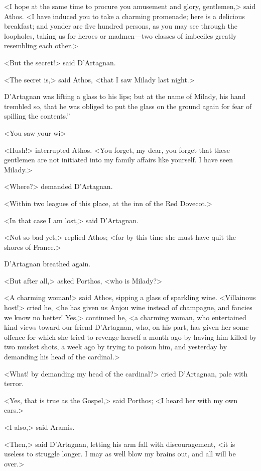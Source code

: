 <I hope at the same time to procure you amusement and glory, gentlemen,> said Athos. <I have induced you to take a charming promenade; here is a delicious breakfast; and yonder are five hundred persons, as you may see through the loopholes, taking us for heroes or madmen—two classes of imbeciles greatly resembling each other.> 

<But the secret!> said D'Artagnan. 

<The secret is,> said Athos, <that I saw Milady last night.> 

D'Artagnan was lifting a glass to his lips; but at the name of Milady, his hand trembled so, that he was obliged to put the glass on the ground again for fear of spilling the contents.” 

<You saw your wi\longdash> 

<Hush!> interrupted Athos. <You forget, my dear, you forget that these gentlemen are not initiated into my family affairs like yourself. I have seen Milady.> 

<Where?> demanded D'Artagnan. 

<Within two leagues of this place, at the inn of the Red Dovecot.> 

<In that case I am lost,> said D'Artagnan. 

<Not so bad yet,> replied Athos; <for by this time she must have quit the shores of France.> 

D'Artagnan breathed again. 

<But after all,> asked Porthos, <who is Milady?> 

<A charming woman!> said Athos, sipping a glass of sparkling wine. <Villainous host!> cried he, <he has given us Anjou wine instead of champagne, and fancies we know no better! Yes,> continued he, <a charming woman, who entertained kind views toward our friend D'Artagnan, who, on his part, has given her some offence for which she tried to revenge herself a month ago by having him killed by two musket shots, a week ago by trying to poison him, and yesterday by demanding his head of the cardinal.> 

<What! by demanding my head of the cardinal?> cried D'Artagnan, pale with terror. 

<Yes, that is true as the Gospel,> said Porthos; <I heard her with my own ears.> 

<I also,> said Aramis. 

<Then,> said D'Artagnan, letting his arm fall with discouragement, <it is useless to struggle longer. I may as well blow my brains out, and all will be over.> 


